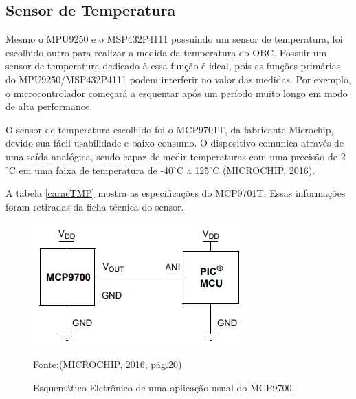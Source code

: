 \subsection{Sensor de Temperatura}

Mesmo o MPU9250 e o MSP432P4111 possuindo um sensor de temperatura, foi escolhido outro para realizar a medida da temperatura do OBC. Possuir um sensor de temperatura dedicado à essa função é ideal, pois as funções primárias do MPU9250/MSP432P4111 podem interferir no valor das medidas. Por exemplo, o microcontrolador começará a esquentar após um período muito longo em modo de alta performance. 

O sensor de temperatura escolhido foi o MCP9701T, da fabricante Microchip, devido sua fácil usabilidade e baixo consumo. O dispositivo comunica através de uma saída analógica, sendo capaz de medir temperaturas com uma precisão de 2 $^{\circ}$C em uma faixa de temperatura de -40$^{\circ}$C a 125$^{\circ}$C (MICROCHIP, 2016).

A tabela \ref{caracTMP} mostra as especificações do MCP9701T. Essas informações foram retiradas da ficha técnica do sensor.

\begin{figure}[h]
	\centering
	\caption{Esquemático Eletrônico de uma aplicação usual do MCP9700.}
	
	\includegraphics[keepaspectratio=true,scale=0.6]{figuras/MCP9700.PNG}
	
	Fonte:(MICROCHIP, 2016, pág.20)\linebreak
	\label{MCP9700}
\end{figure}

